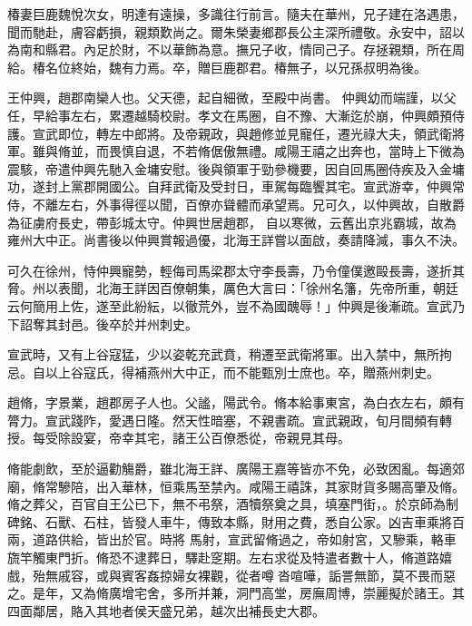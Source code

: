 \begin{pinyinscope}
 椿妻巨鹿魏悅次女，明達有遠操，多識往行前言。隨夫在華州，兄子建在洛遇患，聞而馳赴，膚容虧損，親類歎尚之。爾朱榮妻鄉郡長公主深所禮敬。永安中，詔以為南和縣君。內足於財，不以華飾為意。撫兄子收，情同己子。存拯親類，所在周給。椿名位終始，魏有力焉。卒，贈巨鹿郡君。椿無子，以兄孫叔明為後。



 王仲興，趙郡南欒人也。父天德，起自細微，至殿中尚書。
 仲興幼而端謹，以父任，早給事左右，累遷越騎校尉。孝文在馬圈，自不豫、大漸迄於崩，仲興頗預侍護。宣武即位，轉左中郎將。及帝親政，與趙修並見寵任，遷光祿大夫，領武衛將軍。雖與脩並，而畏慎自退，不若脩倨傲無禮。咸陽王禧之出奔也，當時上下微為震駭，帝遣仲興先馳入金墉安慰。後與領軍于勁參機要，因自回馬圈侍疾及入金墉功，遂封上黨郡開國公。自拜武衛及受封日，車駕每臨饗其宅。宣武游幸，仲興常侍，不離左右，外事得徑以聞，百僚亦聳體而承望焉。兄可久，以仲興故，自散爵為征虜府長史，帶彭城太守。仲興世居趙郡，
 自以寒微，云舊出京兆霸城，故為雍州大中正。尚書後以仲興賞報過優，北海王詳嘗以面啟，奏請降減，事久不決。



 可久在徐州，恃仲興寵勢，輕侮司馬梁郡太守李長壽，乃令僮僕邀毆長壽，遂折其脅。州以表聞，北海王詳因百僚朝集，厲色大言曰：「徐州名籓，先帝所重，朝廷云何簡用上佐，遂至此紛紜，以徹荒外，豈不為國醜辱！」仲興是後漸疏。宣武乃下詔奪其封邑。後卒於并州刺史。



 宣武時，又有上谷寇猛，少以姿乾充武賁，稍遷至武衛將軍。出入禁中，無所拘忌。自以上谷寇氏，得補燕州大中正，而不能甄別士庶也。卒，贈燕州刺史。



 趙脩，字景業，趙郡房子人也。父謐，陽武令。脩本給事東宮，為白衣左右，頗有膂力。宣武踐阼，愛遇日隆。然天性暗塞，不親書疏。宣武親政，旬月間頻有轉授。每受除設宴，帝幸其宅，諸王公百僚悉從，帝親見其母。



 脩能劇飲，至於逼勸觴爵，雖北海王詳、廣陽王嘉等皆亦不免，必致困亂。每適郊廟，脩常驂陪，出入華林，恒乘馬至禁內。咸陽王禧誅，其家財貨多賜高肇及脩。脩之葬父，百官自王公已下，無不弔祭，酒犢祭奠之具，填塞門街，。於京師為制碑銘、石獸、石柱，皆發人車牛，傳致本縣，財用之費，悉自公家。凶吉車乘將百兩，道路供給，皆出於官。時將
 馬射，宣武留脩過之，帝如射宮，又驂乘，輅車旒竿觸東門折。脩恐不逮葬日，驛赴窆期。左右求從及特遣者數十人，脩道路嬉戲，殆無戚容，或與賓客姦掠婦女裸觀，從者噂沓喧嘩，詬詈無節，莫不畏而惡之。是年，又為脩廣增宅舍，多所并兼，洞門高堂，房廡周博，崇麗擬於諸王。其四面鄰居，賂入其地者侯天盛兄弟，越次出補長史大郡。




\end{pinyinscope}
